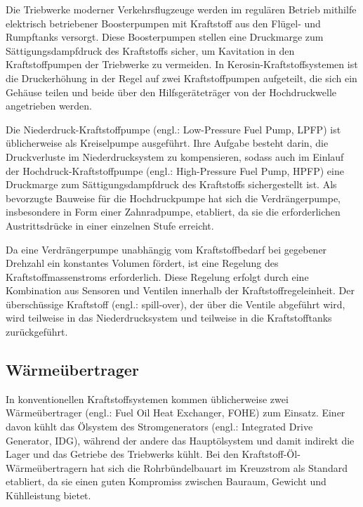 Die Triebwerke moderner Verkehrsflugzeuge werden im regulären Betrieb mithilfe elektrisch betriebener Boosterpumpen mit Kraftstoff aus den Flügel- und Rumpftanks versorgt. Diese Boosterpumpen stellen eine Druckmarge zum Sättigungsdampfdruck des Kraftstoffs sicher, um Kavitation in den Kraftstoffpumpen der Triebwerke zu vermeiden. In Kerosin-Kraftstoffsystemen ist die Druckerhöhung in der Regel auf zwei Kraftstoffpumpen aufgeteilt, die sich ein Gehäuse teilen und beide über den Hilfsgeräteträger von der Hochdruckwelle angetrieben werden. \cite{Braunling.2015}

Die Niederdruck-Kraftstoffpumpe (engl.: Low-Pressure Fuel Pump, LPFP) ist üblicherweise als Kreiselpumpe ausgeführt. Ihre Aufgabe besteht darin, die Druckverluste im Niederdrucksystem zu kompensieren, sodass auch im Einlauf der Hochdruck-Kraftstoffpumpe (engl.: High-Pressure Fuel Pump, HPFP) eine  Druckmarge zum Sättigungsdampfdruck des Kraftstoffs sichergestellt ist. Als bevorzugte Bauweise für die Hochdruckpumpe hat sich die Verdrängerpumpe, insbesondere in Form einer Zahnradpumpe, etabliert, da sie  die erforderlichen Austrittsdrücke in einer einzelnen Stufe erreicht. \cite{Braunling.2015}

Da eine Verdrängerpumpe unabhängig vom Kraftstoffbedarf bei gegebener Drehzahl ein konstantes Volumen fördert, ist eine Regelung des Kraftstoffmassenstroms erforderlich. Diese Regelung erfolgt durch eine Kombination aus Sensoren und Ventilen innerhalb der Kraftstoffregeleinheit. Der überschüssige Kraftstoff (engl.: spill-over), der über die Ventile abgeführt wird, wird teilweise in das Niederdrucksystem und teilweise in die Kraftstofftanks zurückgeführt. \cite{Braunling.2015}

\subsection{Wärmeübertrager}

In konventionellen Kraftstoffsystemen kommen üblicherweise zwei Wärmeübertrager (engl.: Fuel Oil Heat Exchanger, FOHE) zum Einsatz. Einer davon kühlt das Ölsystem des Stromgenerators (engl.: Integrated Drive Generator, IDG), während der andere das Hauptölsystem und damit indirekt die Lager und das Getriebe des Triebwerks kühlt. Bei den Kraftstoff-Öl-Wärmeübertragern hat sich die Rohrbündelbauart im Kreuzstrom als Standard etabliert, da sie einen guten Kompromiss zwischen Bauraum, Gewicht und Kühlleistung bietet. \cite{Braunling.2015, LinkeDiesinger.2014}

